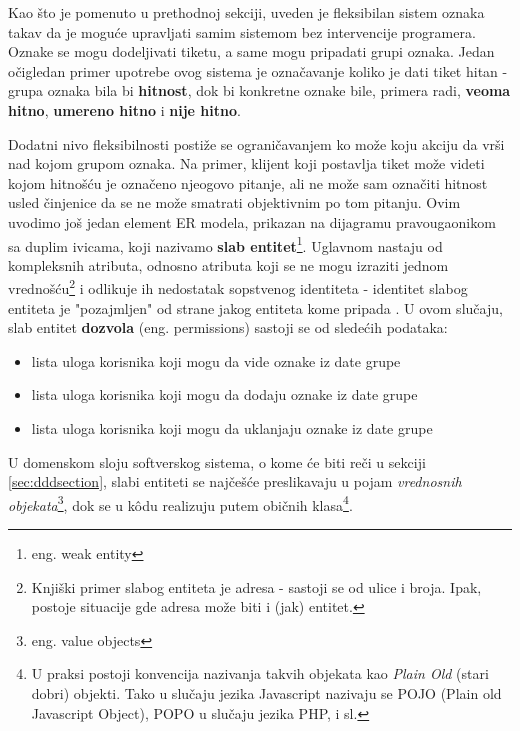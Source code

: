 \documentclass[12pt,oneside]{memoir}
\begin{document}
Kao što je pomenuto u prethodnoj sekciji, uveden je fleksibilan sistem oznaka takav da je moguće upravljati samim sistemom bez intervencije programera. Oznake se mogu dodeljivati tiketu, a same mogu pripadati grupi oznaka. Jedan očigledan primer upotrebe ovog sistema je označavanje koliko je dati tiket hitan - grupa oznaka bila bi \textbf{hitnost}, dok bi konkretne oznake bile, primera radi, \textbf{veoma hitno}, \textbf{umereno hitno} i \textbf{nije hitno}.

Dodatni nivo fleksibilnosti postiže se ograničavanjem ko može koju akciju da vrši nad kojom grupom oznaka. Na primer, klijent koji postavlja tiket može videti kojom hitnošću je označeno njeogovo pitanje, ali ne može sam označiti hitnost usled činjenice da se ne može smatrati objektivnim po tom pitanju. Ovim uvodimo još jedan element ER modela, prikazan na dijagramu pravougaonikom sa duplim ivicama, koji nazivamo \textbf{slab entitet}\footnote{eng. weak entity}. Uglavnom nastaju od kompleksnih atributa, odnosno atributa koji se ne mogu izraziti jednom vrednošću\footnote{Knjiški primer slabog entiteta je adresa - sastoji se od ulice i broja. Ipak, postoje situacije gde adresa može biti i (jak) entitet.} i odlikuje ih nedostatak sopstvenog identiteta - identitet slabog entiteta je "pozajmljen" od strane jakog entiteta kome pripada \cite{dbmodelinganddesign}. U ovom slučaju, slab entitet \textbf{dozvola} (eng. permissions) sastoji se od sledećih podataka:
\begin{itemize}
    \item lista uloga korisnika koji mogu da vide oznake iz date grupe
    \item lista uloga korisnika koji mogu da dodaju oznake iz date grupe
    \item lista uloga korisnika koji mogu da uklanjaju oznake iz date grupe
\end{itemize}

U domenskom sloju softverskog sistema, o kome će biti reči u sekciji \ref{sec:dddsection}, slabi entiteti se najčešće preslikavaju u pojam \textit{vrednosnih objekata}\footnote{eng. value objects}, dok se u k\^{o}du realizuju putem običnih klasa\footnote{U praksi postoji konvencija nazivanja takvih objekata kao \textit{Plain Old} (stari dobri) objekti. Tako u slučaju jezika Javascript nazivaju se POJO (Plain old Javascript Object), POPO u slučaju jezika PHP, i sl.}.


\end{document}

